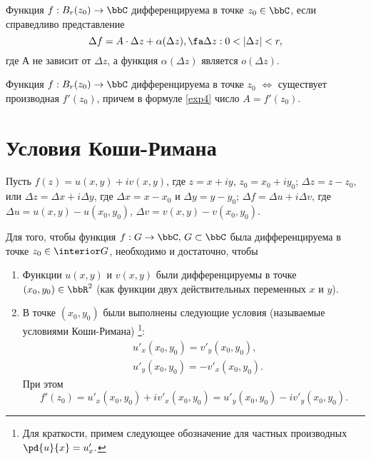 \begin{defn}
Функция $f : B_r(z_0) \to \bbC $ дифференцируема в точке $z_0 \in \bbC$, если справедливо представление 
\begin{equation}
\label{exp4}
\Delta f = A\cdot \Delta z + \alpha(\Delta z), \fa \Delta z: 0 < |\Delta z|< r,
\end{equation}
где А не зависит от $\Delta z$, а функция $\alpha(\Delta z)$ является $o(\Delta z)$.
\end{defn}

\begin{lemm}
Функция $f : B_r(z_0) \to \bbC $ дифференцируема в точке $z_0$ $\Longleftrightarrow$ существует производная $f'(z_0)$, причем в формуле \eqref{exp4} число $A=f'(z_0)$.
\end{lemm}

\section{Условия Коши-Римана}  
Пусть $f(z)=u(x,y)+iv(x,y)$, где $z=x+iy$, $z_0=x_0+iy_0$; $\Delta z=z-z_0$, или $\Delta z = \Delta x + i\Delta y$, где $\Delta x = x-x_0$ и $\Delta y =y-y_0$; $\Delta f = \Delta u + i\Delta v$, где $\Delta u = u(x,y)-u(x_0,y_0)$,  $\Delta v = v(x,y)-v(x_0,y_0)$. 
\begin{thm} 
Для того, чтобы функция $f: G  \to \bbC,\, G \subset \bbC$ была дифференцируема в точке $z_0\in \interior G$, необходимо и достаточно, чтобы
\begin{enumerate}
\item
Функции $u(x,y)$ и $v(x,y)$ были дифференцируемы в точке $(x_0,y_0) \in \bbR^2$ (как функции двух действительных переменных $x$ и $y$).
\item
В точке  $(x_0,y_0)$ были выполнены следующие условия (называемые условиями Коши-Римана) \footnote{Для краткости, примем следующее обозначение для частных производных $\pd{\textstyle u}{ \textstyle x}=u'_x.$}:
\begin{equation}
\label{exp17}
\begin{split}
&u'_x(x_0,y_0) = v'_y(x_0,y_0), \\ &u'_y(x_0,y_0) = -v'_x(x_0,y_0).
\end{split}
\end{equation}
При этом
\begin{equation}
\label{exp8}
f'(z_0) = u'_x(x_0,y_0) + iv'_x(x_0,y_0)= u'_y(x_0,y_0) -iv'_y(x_0,y_0).
\end{equation}
\end{enumerate}
\end{thm}
